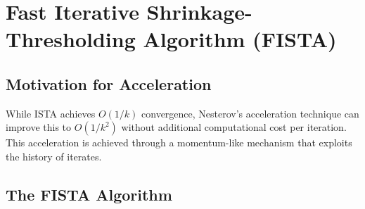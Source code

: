 \documentclass[12pt]{article}
\begin{document}
\newpage
\section{Fast Iterative Shrinkage-Thresholding Algorithm (FISTA)}

\subsection{Motivation for Acceleration}

While ISTA achieves $O(1/k)$ convergence, Nesterov's acceleration technique can improve this to $O(1/k^2)$ without additional computational cost per iteration. This acceleration is achieved through a momentum-like mechanism that exploits the history of iterates.

\subsection{The FISTA Algorithm}
\end{document}
